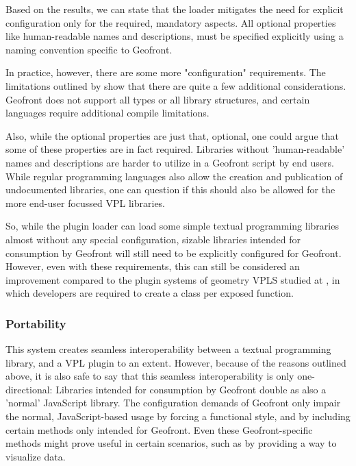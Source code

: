 Based on the results, we can state that the loader mitigates the need for explicit configuration only for the required, mandatory aspects. 
All optional properties like human-readable names and descriptions, must be specified explicitly using a naming convention specific to Geofront. 

In practice, however, there are some more "configuration" requirements. 
The limitations outlined by  show that there are quite a few additional considerations. 
Geofront does not support all types or all library structures, and certain languages require additional compile limitations.

Also, while the optional properties are just that, optional, one could argue that some of these properties are in fact required. 
Libraries without 'human-readable' names and descriptions are harder to utilize in a Geofront script by end users.
While regular programming languages also allow the creation and publication of undocumented libraries, one can question if this should also be allowed for the more end-user focussed VPL libraries.

So, while the plugin loader can load some simple textual programming libraries almost without any special configuration, sizable libraries intended for consumption by Geofront will still need to be explicitly configured for Geofront.
However, even with these requirements, this can still be considered an improvement compared to the plugin systems of geometry VPLS studied at , 
in which developers are required to create a class per exposed function.

\subsubsection{Portability}

This system creates seamless interoperability between a textual programming library, and a VPL plugin to an extent. 
However, because of the reasons outlined above, it is also safe to say that this seamless interoperability is only one-directional: 
Libraries intended for consumption by Geofront double as also a 'normal' JavaScript library. 
The configuration demands of Geofront only impair the normal, JavaScript-based usage by forcing a functional style, and by including certain methods only intended for Geofront. 
Even these Geofront-specific methods might prove useful in certain scenarios, such as by providing a way to visualize data.

